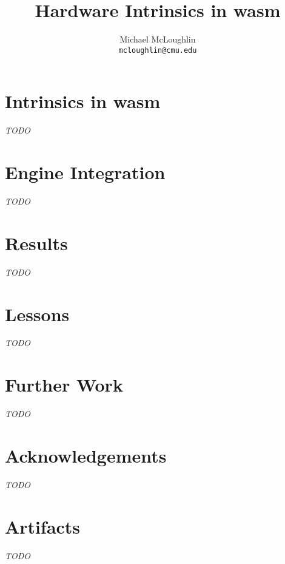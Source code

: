 \documentclass{article}
\newcommand{\wasml}{\acl{wasm}\xspace}
\begin{document}
\title{Hardware Intrinsics in \wasml}
\author{Michael McLoughlin \\ \texttt{mcloughlin@cmu.edu}}
\maketitle




\section{Intrinsics in \wasml}
\emph{TODO}

\section{Engine Integration}
\emph{TODO}

\section{Results}
\emph{TODO}

\section{Lessons}
\emph{TODO}

\section{Further Work}
\emph{TODO}

\section*{Acknowledgements}
\emph{TODO}

\appendix

\section{Artifacts}
\emph{TODO}

\printbibliography
\end{document}
